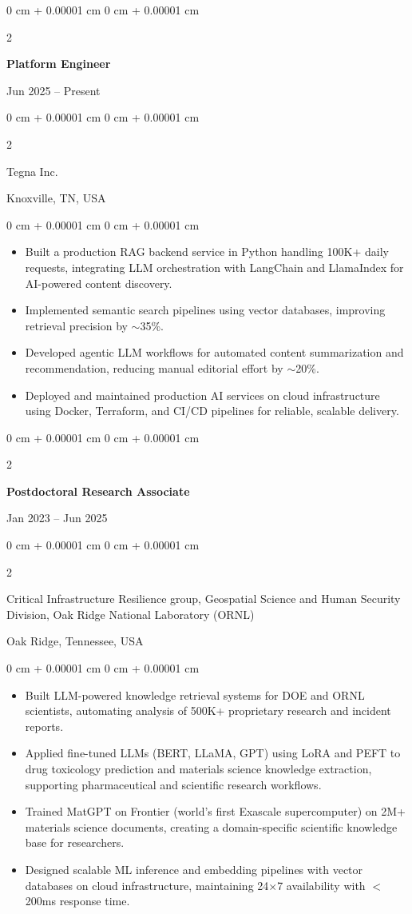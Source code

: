 \documentclass[10pt, letterpaper]{article}
\newenvironment{highlights}{
    \begin{itemize}[
        topsep=0.10 cm,
        parsep=0.10 cm,
        partopsep=0pt,
        itemsep=0pt,
        leftmargin=0 cm + 10pt
    ]
}{
    \end{itemize}
} %
\newenvironment{onecolentry}{
    \begin{adjustwidth}{
        0 cm + 0.00001 cm
    }{
        0 cm + 0.00001 cm
    }
}{
    \end{adjustwidth}
} %
\newenvironment{twocolentry}[2][]{
    \onecolentry
    \def\secondColumn{#2}
    \setcolumnwidth{\fill, 4.5 cm}
    \begin{paracol}{2}
}{
    \switchcolumn \raggedleft \secondColumn
    \end{paracol}
    \endonecolentry
} %
\begin{document}
    \begin{twocolentry}{Jun 2025 -- Present}
        \textbf{Platform Engineer}
    \end{twocolentry}
    \begin{twocolentry}{Knoxville, TN, USA}
       Tegna Inc.
    \end{twocolentry}
    
    \begin{onecolentry}
        \begin{highlights}
            \item Built a production RAG backend service in Python handling 100K+ daily requests, integrating LLM orchestration with LangChain and LlamaIndex for AI-powered content discovery.
            \item Implemented semantic search pipelines using vector databases, improving retrieval precision by $\sim$35\%.
            \item Developed agentic LLM workflows for automated content summarization and recommendation, reducing manual editorial effort by $\sim$20\%.
            \item Deployed and maintained production AI services on cloud infrastructure using Docker, Terraform, and CI/CD pipelines for reliable, scalable delivery.
        \end{highlights}
    \end{onecolentry}

\vspace{1mm}
    
    \begin{twocolentry}{Jan 2023 -- Jun 2025}
        \textbf{Postdoctoral Research Associate}
    \end{twocolentry}
    \begin{twocolentry}{Oak Ridge, Tennessee, USA}
        Critical Infrastructure Resilience group, Geospatial Science and Human Security Division, Oak Ridge National Laboratory (ORNL)
    \end{twocolentry}
    \vspace{0.10 cm}
    \begin{onecolentry}
        \begin{highlights}
            \item Built LLM-powered knowledge retrieval systems for DOE and ORNL scientists, automating analysis of 500K+ proprietary research and incident reports.
            \item Applied fine-tuned LLMs (BERT, LLaMA, GPT) using LoRA and PEFT to drug toxicology prediction and materials science knowledge extraction, supporting pharmaceutical and scientific research workflows.
            \item Trained MatGPT on Frontier (world’s first Exascale supercomputer) on 2M+ materials science documents, creating a domain-specific scientific knowledge base for researchers.
            \item Designed scalable ML inference and embedding pipelines with vector databases on cloud infrastructure, maintaining 24×7 availability with $<$200ms response time.
        \end{highlights}
    \end{onecolentry}
\end{document}
